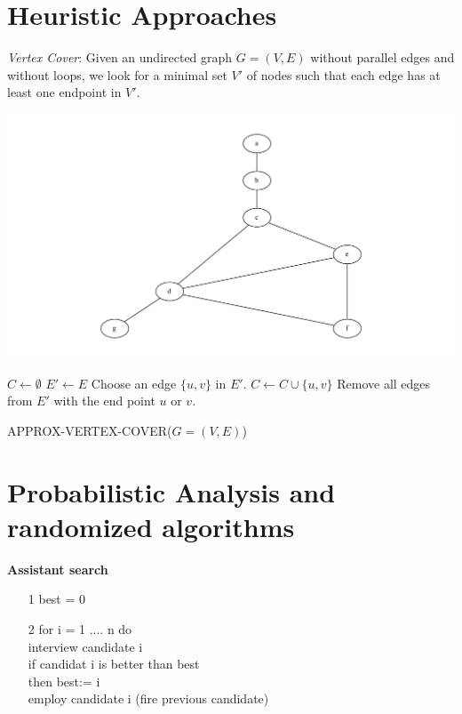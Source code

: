 \section{Heuristic Approaches}
\emph{Vertex Cover}: Given an undirected graph $G=(V,E)$ without parallel edges and without loops,
we look for a minimal set $V'$ of nodes such that each edge has at least one endpoint in $V'$.
\begin{example*}
\includegraphics[width=\textwidth]{diagrams/Chapter7_Example1.pdf}
\end{example*}
\begin{algorithm}
\begin{algorithmic}[1]
\State $C \gets \emptyset$
\State $E' \gets E$
	\State Choose an edge $\{u,v\}$ in $E'$.
	\State $C \gets C \cup \{u,v\}$
	\State Remove all edges from $E'$ with the end point $u$ or $v$.
\EndWhile
\end{algorithmic}
\caption{APPROX-VERTEX-COVER($G=(V,E)$)}
\end{algorithm}

\section{Probabilistic Analysis and randomized algorithms}

\textbf{Assistant search}
\begin{enumerate}
  \item[1] best = 0
  \item[2] for i = 1 .... n do\\
\noindent\hspace*{10mm}	interview candidate i\\
\noindent\hspace*{10mm}	if candidat i is better than best\\
\noindent\hspace*{20mm}		then best:= i\\
\noindent\hspace*{20mm}		employ candidate i (fire previous candidate)\\
\end{enumerate}

